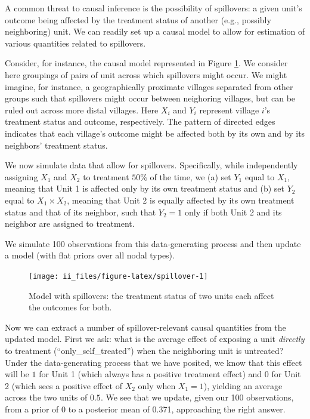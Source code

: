 \documentclass[
  12pt,
]{book}
\begin{document}
A common threat to causal inference is the possibility of spillovers: a given unit's outcome being affected by the treatment status of another (e.g., possibly neighboring) unit. We can readily set up a causal model to allow for estimation of various quantities related to spillovers.

Consider, for instance, the causal model represented in Figure \ref{fig:spillover}. We consider here groupings of pairs of unit across which spillovers might occur. We might imagine, for instance, a geographically proximate villages separated from other groups such that spillovers might occur between neighoring villages, but can be ruled out across more distal villages. Here \(X_i\) and \(Y_i\) represent village \(i\)'s treatment status and outcome, respectively. The pattern of directed edges indicates that each village's outcome might be affected both by its own and by its neighbors' treatment status.

We now simulate data that allow for spillovers. Specifically, while independently assigning \(X_1\) and \(X_2\) to treatment \(50 \%\) of the time, we (a) set \(Y_1\) equal to \(X_1\), meaning that Unit 1 is affected only by its own treatment status and (b) set \(Y_2\) equal to \(X_1 \times X_2\), meaning that Unit 2 is equally affected by its own treatment status and that of its neighbor, such that \(Y_2 = 1\) only if both Unit 2 and its neighbor are assigned to treatment.

We simulate 100 observations from this data-generating process and then update a model (with flat priors over all nodal types).

\begin{figure}

{\centering \texttt{[image: ii\_files/figure-latex/spillover-1]} 

}

\caption{Model with spillovers: the treatment status of two units each affect the outcomes for both.}\label{fig:spillover}
\end{figure}

Now we can extract a number of spillover-relevant causal quantities from the updated model. First we ask: what is the average effect of exposing a unit \emph{directly} to treatment (``only\_self\_treated'') when the neighboring unit is untreated? Under the data-generating process that we have posited, we know that this effect will be \(1\) for Unit 1 (which always has a positive treatment effect) and \(0\) for Unit 2 (which sees a positive effect of \(X_2\) only when \(X_1 = 1\)), yielding an average across the two units of \(0.5\). We see that we update, given our 100 observations, from a prior of 0 to a posterior mean of 0.371, approaching the right answer.
\end{document}
